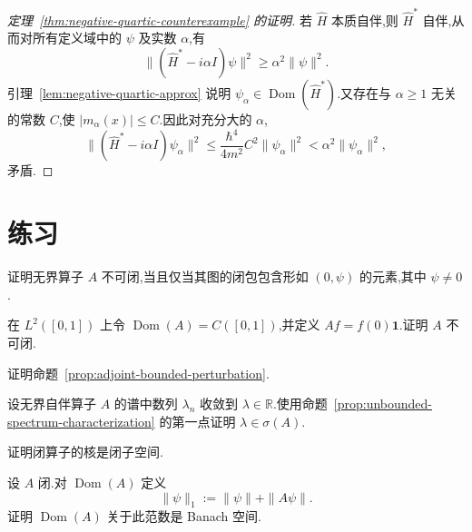 \begin{proof}[定理~\ref{thm:negative-quartic-counterexample} 的证明]
若 \(\widehat H\) 本质自伴,则 \(\widehat H^{*}\) 自伴,从而对所有定义域中的 \(\psi\) 及实数 \(\alpha\),有
\[
\| (\widehat H^{*}-i\alpha I)\psi\|^{2}
\geq\alpha^{2}\|\psi\|^{2}.
\]
引理~\ref{lem:negative-quartic-approx} 说明 \(\psi_{\alpha}\in\operatorname{Dom}(\widehat H^{*})\).又存在与 \(\alpha\geq1\) 无关的常数 \(C\),使 \(|m_{\alpha}(x)|\leq C\).因此对充分大的 \(\alpha\),
\[
\|(\widehat H^{*}-i\alpha I)\psi_{\alpha}\|^{2}
\leq\frac{\hbar^{4}}{4m^{2}}C^{2}\|\psi_{\alpha}\|^{2}
<\alpha^{2}\|\psi_{\alpha}\|^{2},
\]
矛盾.
\end{proof}

\section{练习}
\label{sec:chapter9-exercises}

\begin{exercise}[不可闭算子的判据]\label{ex:not-closable-graph}
证明无界算子 \(A\) 不可闭,当且仅当其图的闭包包含形如 \((0,\psi)\) 的元素,其中 \(\psi\neq0\).
\end{exercise}

\begin{exercise}[不可闭的取值算子]\label{ex:not-closable-evaluation}
在 \(L^{2}([0,1])\) 上令 \(\operatorname{Dom}(A)=C([0,1])\),并定义 \(Af=f(0)\mathbf{1}\).证明 \(A\) 不可闭.
\end{exercise}

\begin{exercise}[有界扰动的伴随]\label{ex:adjoint-sum-bounded}
证明命题~\ref{prop:adjoint-bounded-perturbation}.
\end{exercise}

\begin{exercise}[无界自伴谱的闭性]\label{ex:unbounded-spectrum-closed}
设无界自伴算子 \(A\) 的谱中数列 \(\lambda_{n}\) 收敛到 \(\lambda\in\mathbb{R}\).使用命题~\ref{prop:unbounded-spectrum-characterization} 的第一点证明 \(\lambda\in\sigma(A)\).
\end{exercise}

\begin{exercise}[闭算子的核]\label{ex:closed-kernel}
证明闭算子的核是闭子空间.
\end{exercise}

\begin{exercise}[图范数]\label{ex:graph-norm-banach}
设 \(A\) 闭.对 \(\operatorname{Dom}(A)\) 定义
\[
\|\psi\|_{1}:=\|\psi\|+\|A\psi\|.
\]
证明 \(\operatorname{Dom}(A)\) 关于此范数是 Banach 空间.
\end{exercise}

